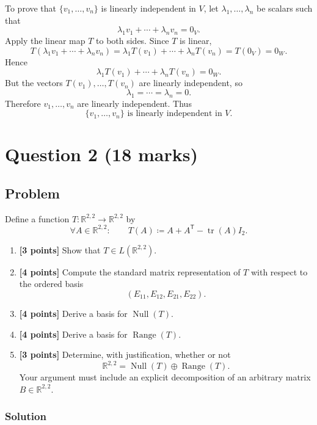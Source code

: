 \documentclass[12pt]{article}
\newcommand{\R}{\mathbb{R}}
\DeclareMathOperator{\Range}{Range}
\DeclareMathOperator{\Null}{Null}
\begin{document}
To prove that \(\{v_1,\dots,v_n\}\) is linearly independent in \(V\), let \(\lambda_1,\dots,\lambda_n\) be scalars such that
\[
\lambda_1 v_1+\cdots+\lambda_n v_n=0_V.
\]
Apply the linear map \(T\) to both sides. Since \(T\) is linear,
\[
T(\lambda_1 v_1+\cdots+\lambda_n v_n)
=
\lambda_1 T(v_1)+\cdots+\lambda_n T(v_n)
=
T(0_V)=0_W.
\]
Hence
\[
\lambda_1 T(v_1)+\cdots+\lambda_n T(v_n)=0_W.
\]
But the vectors \(T(v_1),\dots,T(v_n)\) are linearly independent, so
\[
\lambda_1=\cdots=\lambda_n=0.
\]
Therefore \(v_1,\dots,v_n\) are linearly independent. Thus
\[
\boxed{\{v_1,\dots,v_n\}\text{ is linearly independent in }V.}
\]

\newpage

\section{Question 2 \hfill (18 marks)}

\subsection{Problem}

Define a function \(T:\R^{2,2}\to \R^{2,2}\) by
\[
\forall A\in \R^{2,2}:\qquad
T(A)\coloneqq A+A^{\mathsf T}-\operatorname{tr}(A)I_2.
\]

\begin{enumerate}[label=(\alph*)]
\item \textbf{[3 points]} Show that \(T\in L(\R^{2,2})\).

\item \textbf{[4 points]} Compute the standard matrix representation of \(T\) with respect to the ordered basis
\[
(E_{11},E_{12},E_{21},E_{22}).
\]

\item \textbf{[4 points]} Derive a basis for \(\Null(T)\).

\item \textbf{[4 points]} Derive a basis for \(\Range(T)\).

\item \textbf{[3 points]} Determine, with justification, whether or not
\[
\R^{2,2}=\Null(T)\oplus \Range(T).
\]
Your argument must include an explicit decomposition of an arbitrary matrix \(B\in \R^{2,2}\).
\end{enumerate}

\subsubsection{Solution}
\end{document}
